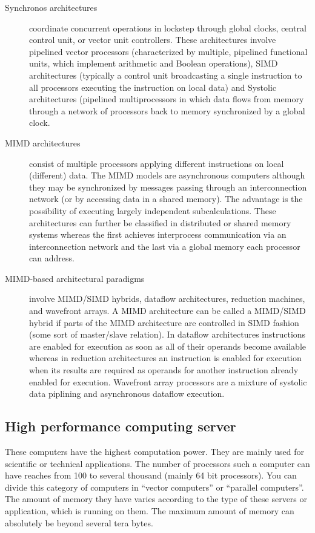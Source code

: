 \begin{description}
\item[Synchronos architectures] coordinate concurrent operations in
  lockstep through global clocks, central control unit, or vector unit
  controllers. These architectures involve pipelined vector processors
  (characterized by multiple, pipelined functional units, which
  implement arithmetic and Boolean operations), SIMD architectures
  (typically a control unit broadcasting a single instruction to
  all processors executing the instruction on local data) and Systolic
  architectures (pipelined multiprocessors in which data flows from
  memory through a network of processors back to memory synchronized
  by a global clock. 
\item[MIMD architectures] consist of multiple processors applying
  different instructions on local (different) data. The MIMD models
  are asynchronous computers although they may be synchronized by
  messages passing through an interconnection network (or by accessing
  data in a shared memory). The advantage is the possibility of
  executing largely independent subcalculations. These architectures
  can further be classified in distributed or shared memory systems
  whereas the first achieves interprocess communication via an
  interconnection network and the last via a global memory each
  processor can address.
\item[MIMD-based architectural paradigms] involve MIMD/SIMD hybrids,
  dataflow architectures, reduction machines, and wavefront arrays. A
  MIMD architecture can be called a MIMD/SIMD hybrid if parts of the
  MIMD architecture are controlled in SIMD fashion (some sort of
  master/slave relation). In dataflow architectures instructions are
  enabled for execution as soon as all of their operands become
  available whereas in reduction architectures an instruction is
  enabled for execution when its results are required as operands for
  another instruction already enabled for execution. Wavefront array
  processors are a mixture of systolic data piplining and asynchronous
  dataflow execution.
\end{description}

\subsection{High performance computing server}

These computers have the highest computation power. They are mainly used
for scientific or technical applications. The number of processors
such a computer can have reaches from 100 to several thousand (mainly
64 bit processors).
You can divide this category of computers in ``vector computers'' or ``parallel
computers''. The amount of memory they have varies according to the type of
these servers or application, which is running on them. The maximum
amount of memory can absolutely be beyond several tera bytes.  

